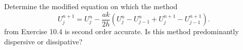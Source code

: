 

Determine the modified equation on which the method
\begin{equation*}
U_j^{n+1} = U_j^n - \frac{ak}{2h}(U_j^n-U_{j-1}^n + U_j^{n+1}-U_{j-1}^{n+1}).
\end{equation*}
from Exercise 10.4 is second order accurate.  Is this method predominantly
dispersive or dissipative?
